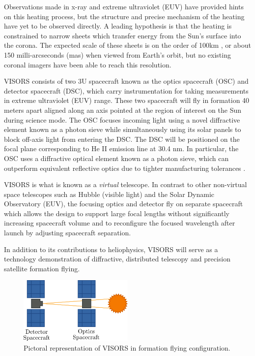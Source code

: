 \documentclass[tocnosub,noragright,centerchapter,12pt]{uiucecethesis09}
\begin{document}
Observations made in x-ray and extreme ultraviolet (EUV) have provided hints on this heating process, but the structure and precise mechanism of the heating have yet to be observed directly.  A leading hypothesis is that the heating is constrained to narrow sheets which transfer energy from the Sun's surface into the corona.  The expected scale of these sheets is on the order of 100km \cite{klimchuk2015}, or about 150 milli-arcseconds (mas) when viewed from Earth's orbit, but no existing coronal imagers have been able to reach this resolution.

VISORS consists of two 3U spacecraft known as the optics spacecraft (OSC) and detector spacecraft (DSC), which carry instrumentation for taking measurements in extreme ultraviolet (EUV) range.  These two spacecraft will fly in formation 40 meters apart aligned along an axis pointed at the region of interest on the Sun during science mode.  The OSC focuses incoming light using a novel diffractive element known as a photon sieve while simultaneously using its solar panels to block off-axis light from entering the DSC.  The DSC will be positioned on the focal plane corresponding to He II emission line at 30.4 nm.  In particular, the OSC uses a diffractive optical element known as a photon sieve, which can outperform equivalent reflective optics due to tighter manufacturing tolerances \cite{oktem}.


VISORS is what is known as a \emph{virtual} telescope.  In contrast to other non-virtual space telescopes such as Hubble (visible light) and the Solar Dynamic Observatory (EUV), the focusing optics and detector fly on separate spacecraft which allows the design to support large focal lengths without significantly increasing spacecraft volume and to reconfigure the focused wavelength after launch by adjusting spacecraft separation.

In addition to its contributions to heliophysics, VISORS will serve as a technology demonstration of diffractive, distributed telescopy and precision satellite formation flying.


\begin{figure}
  \centering
  \includegraphics[width=0.5\textwidth]{figures/satellite.png}
  \caption{Pictoral representation of VISORS in formation flying configuration.}
\end{figure}
\end{document}
